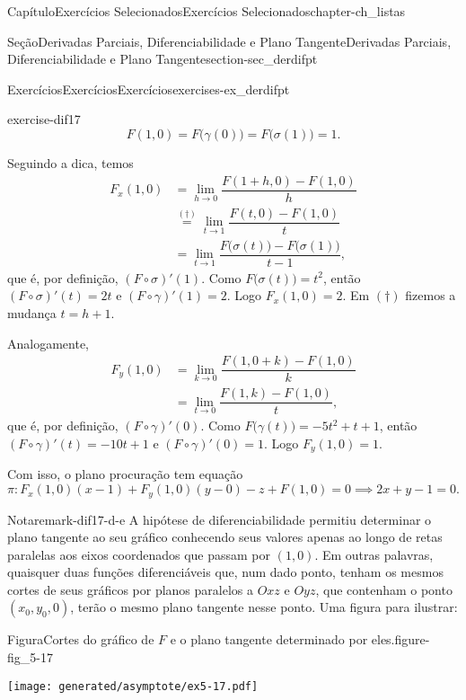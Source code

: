 \documentclass[oneside,10pt,]{book}
\numberwithin{equation}{section}
\begin{document}
\begin{chapterptx}{Capítulo}{Exercícios Selecionados}{}{Exercícios Selecionados}{}{}{chapter-ch_listas}
\begin{sectionptx}{Seção}{Derivadas Parciais, Diferenciabilidade e Plano Tangente}{}{Derivadas Parciais, Diferenciabilidade e Plano Tangente}{}{}{section-sec_derdifpt}
\begin{exercises-subsection-numberless}{Exercícios}{Exercícios}{}{Exercícios}{}{}{exercises-ex_derdifpt}
\begin{divisionexercise}{17}{}{}{exercise-dif17}
\begin{equation*}
\boxed{F(1,0)=F\big(\gamma(0)\big)=F\big(\sigma(1)\big)=1}.
\end{equation*}
%
\par
Seguindo a dica, temos%
\begin{align*}
F_x(1,0)&=\lim\limits_{h\to
0}\dfrac{F(1+h,0)-F(1,0)}{h}\\
&\stackrel{(\dagger)}{=}\lim\limits_{t\to
1}\dfrac{F(t,0)-F(1,0)}{t}\\
&=\lim\limits_{t\to 1}
\dfrac{F\big(\sigma(t)\big)-F\big(\sigma(1)\big)}{t-1},
\end{align*}
que é, por definição, \((F\circ\sigma)'(1)\). Como \(F\big(\sigma(t)\big)=t^2\), então \((F\circ\sigma)'(t)=2t\) e \((F\circ\gamma)'(1)=2\). Logo \(\boxed{F_x(1,0)=2}\). Em \((\dagger)\) fizemos a mudança \(t=h+1\).%
\par
Analogamente,%
\begin{align*}
F_y(1,0)&=\lim\limits_{k\to
0}\dfrac{F(1,0+k)-F(1,0)}{k}\\
&=\lim\limits_{t\to
0}\dfrac{F(1,k)-F(1,0)}{t},
\end{align*}
que é, por definição, \((F\circ\gamma)'(0)\). Como \(F\big(\gamma(t)\big)=-5t^2+t+1\), então \((F\circ\gamma)'(t)=-10t+1\) e \((F\circ\gamma)'(0)=1\). Logo \(\boxed{F_y(1,0)=1}\).%
\par
Com isso, o plano procuração tem equação%
\begin{equation*}
\pi\colon
F_x(1,0)(x-1)+F_y(1,0)(y-0)-z+F(1,0)=0\implies\boxed{2x+y-1=0}.
\end{equation*}
%
\begin{remark}{Nota}{}{remark-dif17-d-e}%
A hipótese de diferenciabilidade permitiu determinar o plano tangente ao seu gráfico conhecendo seus valores apenas ao longo de retas paralelas aos eixos coordenados que passam por \((1,0)\). Em outras palavras, quaisquer duas funções diferenciáveis que, num dado ponto, tenham os mesmos cortes de seus gráficos por planos paralelos a \(Oxz\) e \(Oyz\), que contenham o ponto \((x_0,y_0,0)\), terão o mesmo plano tangente nesse ponto. Uma figura para ilustrar: \begin{figureptx}{Figura}{Cortes do gráfico de \(F\) e o plano tangente determinado por eles.}{figure-fig_5-17}{}%
\begin{image}{0.25}{0.5}{0.25}{}%
\texttt{[image: generated/asymptote/ex5-17.pdf]}
\end{image}%
\tcblower
\end{figureptx}%
\end{remark}

\end{divisionexercise}
\end{exercises-subsection-numberless}
\end{sectionptx}
\end{chapterptx}
\end{document}

